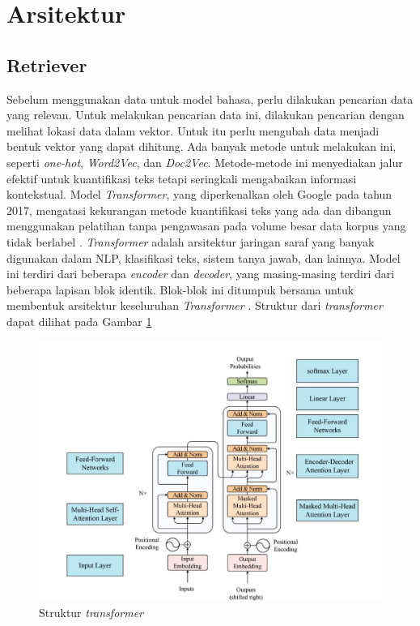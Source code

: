 \section{Arsitektur}
\label{sec:arsitektur}


\subsection{Retriever}
\label{subsec:Retriever}

Sebelum menggunakan data untuk model bahasa, perlu dilakukan pencarian data yang relevan. Untuk melakukan pencarian data ini, dilakukan pencarian dengan melihat lokasi data dalam vektor. Untuk itu perlu mengubah data menjadi bentuk vektor yang dapat dihitung. Ada banyak metode untuk melakukan ini, seperti \emph{one-hot}, \emph{Word2Vec}, dan \emph{Doc2Vec}. Metode-metode ini menyediakan jalur efektif untuk kuantifikasi teks tetapi seringkali mengabaikan informasi kontekstual. Model \emph{Transformer}, yang diperkenalkan oleh Google pada tahun 2017, mengatasi kekurangan metode kuantifikasi teks yang ada dan dibangun menggunakan pelatihan tanpa pengawasan pada volume besar data korpus yang tidak berlabel \cite{vaswani2017attention}. \emph{Transformer} adalah arsitektur jaringan saraf yang banyak digunakan dalam NLP, klasifikasi teks, sistem tanya jawab, dan lainnya. Model ini terdiri dari beberapa \emph{encoder} dan \emph{decoder}, yang masing-masing terdiri dari beberapa lapisan blok identik. Blok-blok ini ditumpuk bersama untuk membentuk arsitektur keseluruhan \emph{Transformer} \cite{miao2016processing}. Struktur dari \emph{transformer} dapat dilihat pada Gambar \ref*{fig:transformer}
\begin{figure}
  \centering
  \includegraphics[width=.7\textwidth]{gambar/struktur-transformer.jpg}
  \caption{Struktur \emph{transformer} \cite{vaswani2017attention}}
  \label{fig:transformer}
\end{figure}

